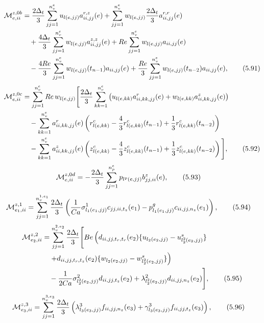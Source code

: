 \documentclass{article}
\begin{document}
\begin{align}
\mathcal{M}_{e,ii}^{z,0b} &= \frac{2\Delta_t}{3} \sum_{jj=1}^{n_v^e} u_{l(e,jj)} a_{ii,jj}^{r,z}(e) + \sum_{jj=1}^{n_v^e} w_{l(e,jj)} \frac{2\Delta_t}{3} a_{ii,jj}^{r,r}(e) \nonumber\\
&\quad + \frac{4\Delta_t}{3} \sum_{jj=1}^{n_v^e} w_{l(e,jj)} a_{ii,jj}^{z,z}(e) + Re \sum_{jj=1}^{n_v^e} w_{l(e,jj)} a_{ii,jj}(e) \nonumber\\
&\quad - \frac{4Re}{3} \sum_{jj=1}^{n_v^e} w_{l(e,jj)}(t_{n-1}) a_{ii,jj}(e) + \frac{Re}{3} \sum_{jj=1}^{n_v^e} w_{l(e,jj)}(t_{n-2}) a_{ii,jj}(e), \tag{5.91}
\end{align}
\begin{align}
\mathcal{M}_{e,ii}^{z,0c} &= \sum_{jj=1}^{n_v^e} Re\, w_{l(e,jj)} \Bigg[ \frac{2\Delta_t}{3} \sum_{kk=1}^{n_v^e} \left( u_{l(e,kk)} a_{ii,kk,jj}^r(e) + w_{l(e,kk)} a_{ii,kk,jj}^z(e) \right) \nonumber\\
&\quad - \sum_{kk=1}^{n_v^e} a_{ii,kk,jj}^r(e) \left( r_{l(e,kk)}^c - \frac{4}{3} r_{l(e,kk)}^c(t_{n-1}) + \frac{1}{3} r_{l(e,kk)}^c(t_{n-2}) \right) \nonumber\\
&\quad - \sum_{kk=1}^{n_v^e} a_{ii,kk,jj}^z(e) \left( z_{l(e,kk)}^c - \frac{4}{3} z_{l(e,kk)}^c(t_{n-1}) + \frac{1}{3} z_{l(e,kk)}^c(t_{n-2}) \right) \Bigg], \tag{5.92}
\end{align}
\begin{align}
\mathcal{M}_{e,ii}^{z,0d} &= -\frac{2\Delta_t}{3} \sum_{jj=1}^{n_p^e} p_{l^p(e,jj)} b_{jj,ii}^z(e), \tag{5.93}
\end{align}
\begin{align}
\mathcal{M}_{e_1,ii}^{z,1} &= \sum_{jj=1}^{n_v^{1,e_1}} \frac{2\Delta_t}{3} \left( \frac{1}{Ca} \sigma_{l_1(e_1,jj)}^1 c_{jj,ii,t_z}(e_1) - p_{l_1(e_1,jj)}^g c_{ii,jj,n_z}(e_1) \right), \tag{5.94}
\end{align}
\begin{align}
\mathcal{M}_{e_2,ii}^{z,2} &= \sum_{jj=1}^{n_v^{2,e_2}} \frac{2\Delta_t}{3} \Bigg[ Be \left( d_{ii,jj,t_r,t_r}(e_2) \{ u_{l_2(e_2,jj)} - u_{l_2^2(e_2,jj)}^s \} \right. \nonumber\\
&\quad \left. + d_{ii,jj,t_r,t_z}(e_2) \{ w_{l_2(e_2,jj)} - w_{l_2^2(e_2,jj)}^s \} \right) \nonumber\\
&\quad - \frac{1}{2Ca} \sigma_{l_2^2(e_2,jj)}^2 d_{ii,jj,t_z}(e_2) + \lambda_{l_2^2(e_2,jj)}^2 d_{ii,jj,n_z}(e_2) \Bigg], \tag{5.95}
\end{align}
\begin{align}
\mathcal{M}_{e_3,ii}^{z,3} &= \sum_{jj=1}^{n_v^{3,e_3}} \frac{2\Delta_t}{3} \left( \lambda_{l_3(e_3,jj)}^3 f_{ii,jj,n_z}(e_3) + \gamma_{l_3(e_3,jj)}^3 f_{ii,jj,t_z}(e_3) \right), \tag{5.96}
\end{align}
\end{document}
